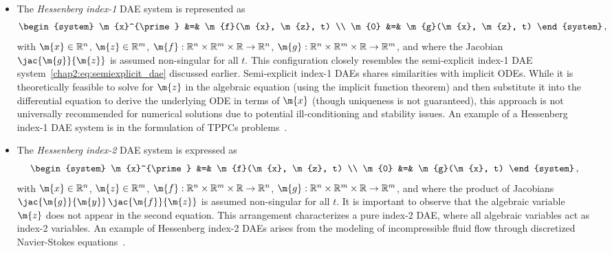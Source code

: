 \begin{itemize}
  \setlength\itemsep{0.0em}
  \item The \emph{Hessenberg index-1} \ac{DAE} system is represented as
  \begin{equation*}
    \begin{system}
      \m{x}^{\prime} &=& \m{f}(\m{x}, \m{z}, t) \\
      \m{0}          &=& \m{g}(\m{x}, \m{z}, t)
    \end{system} \, \text{,}
  \end{equation*}
  with $\m{x} \in \mathbb{R}^n$, $\m{z} \in \mathbb{R}^m$, $\m{f}: \mathbb{R}^{n} \times \mathbb{R}^{m} \times \mathbb{R} \rightarrow \mathbb{R}^{n}$, $\m{g}: \mathbb{R}^{n} \times \mathbb{R}^{m} \times \mathbb{R} \rightarrow \mathbb{R}^{m}$, and where the Jacobian $\jac{\m{g}}{\m{z}}$ is assumed non-singular for all $t$. This configuration closely resembles the semi-explicit index-1 \ac{DAE} system~\eqref{chap2:eq:semiexplicit_dae} discussed earlier. Semi-explicit index-1 \acp{DAE} shares similarities with implicit \acp{ODE}. While it is theoretically feasible to solve for $\m{z}$ in the algebraic equation (using the implicit function theorem) and then substitute it into the differential equation to derive the underlying \ac{ODE} in terms of $\m{x}$ (though uniqueness is not guaranteed), this approach is not universally recommended for numerical solutions due to potential ill-conditioning and stability issues. An example of a Hessenberg index-1 \ac{DAE} system is in the formulation of \acp{TPPC} problems~\cite{brenan1995numerical}.
  \item The \emph{Hessenberg index-2} \ac{DAE} system is expressed as
  \begin{equation*}
    \begin{system}
      \m{x}^{\prime} &=& \m{f}(\m{x}, \m{z}, t) \\
      \m{0}          &=& \m{g}(\m{x}, t)
    \end{system} \, \text{,}
  \end{equation*}
  with $\m{x} \in \mathbb{R}^n$, $\m{z} \in \mathbb{R}^m$, $\m{f}: \mathbb{R}^{n} \times \mathbb{R}^{m} \times \mathbb{R} \rightarrow \mathbb{R}^{n}$, $\m{g}: \mathbb{R}^{n} \times \mathbb{R}^{m} \times \mathbb{R} \rightarrow \mathbb{R}^{m}$, and where the product of Jacobians $\jac{\m{g}}{\m{y}} \, \jac{\m{f}}{\m{z}}$ is assumed non-singular for all $t$. It is important to observe that the algebraic variable $\m{z}$ does not appear in the second equation. This arrangement characterizes a pure index-2 \ac{DAE}, where all algebraic variables act as index-2 variables. An example of Hessenberg index-2 \acp{DAE} arises from the modeling of incompressible fluid flow through discretized Navier-Stokes equations~\cite{ascher1998computer}.

\end{itemize}
